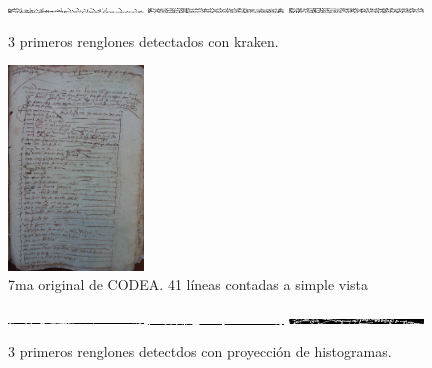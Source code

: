\documentclass[11pt,a4paper]{article}
\begin{document}
\begin{figure}[H] 
\centering 
\begin{minipage}{1.0\textwidth} 
\includegraphics[width=0.32\textwidth]{6_CODEA_1_kraken.png} 
\includegraphics[width=0.32\textwidth]{6_CODEA_2_kraken.png} 
\includegraphics[width=0.32\textwidth]{6_CODEA_3_kraken.png} 
\caption{3 primeros renglones detectados con kraken.} 
\label{fig:3 líneas kraken 6ta CODEA} 
\end{minipage} 
\end{figure}


\begin{figure}[H] 
\centering 
\begin{minipage}{1.0\textwidth} 
\includegraphics[width=0.32\textwidth]{CODEA-3601_1r.jpg} 
\caption{7ma original de CODEA. 41 líneas contadas a simple vista} 
\label{fig:7ma CODEA} 
\end{minipage} 
\end{figure}

\begin{figure}[H] 
\centering 
\begin{minipage}{1.0\textwidth} 
\includegraphics[width=0.32\textwidth]{7_CODEA_1_PH.png} 
\includegraphics[width=0.32\textwidth]{7_CODEA_2_PH.png} 
\includegraphics[width=0.32\textwidth]{7_CODEA_3_PH.png} 
\caption{3 primeros renglones detectdos con proyección de histogramas.} 
\label{fig:3 líneas PH 7ma CODEA} 
\end{minipage} 
\end{figure}
\end{document}
